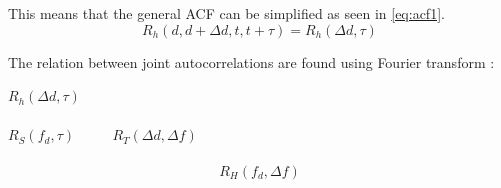 This means that the general ACF can be simplified as seen in \autoref{eq:acf1}.
\begin{equation}\label{eq:acf1}
R_{h}(d,d+\Delta d,t,t+\tau) = R_{h}(\Delta d,\tau) 
\end{equation}
\begin{where}
\end{where}

The relation between joint autocorrelations are found using Fourier transform \citep[ch. 6.5-6.6]{The_Mobile_Radio_Propagation_Channelbook}:

\begin{center}
$R_h(\Delta d,\tau)$\\
\\
$R_S(f_{d},\tau)$ $\quad \quad$ $R_T(\Delta d,\Delta f)$\\
\\
\vspace{-1.9em}
\begin{equation}
R_H(f_{d},\Delta f)
\label{AutocorrDouble}
\end{equation}
\end{center}

\begin{where}
\end{where}



